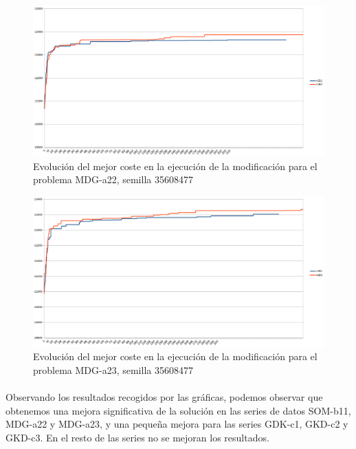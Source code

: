 	\begin{figure}[H]
		\centering
		\includegraphics[scale=0.3]{img/convergenciaMDG2mejora.png}
		\caption{Evolución del mejor coste en la ejecución de la modificación para el problema MDG-a22, semilla 35608477}
		\label{MDG-a_22_convergencia_mejora}
	\end{figure}

	\begin{figure}[H]
		\centering
		\includegraphics[scale=0.3]{img/convergenciaMDG3mejora.png}
		\caption{Evolución del mejor coste en la ejecución de la modificación para el problema MDG-a23, semilla 35608477}
		\label{MDG-a_23_convergencia_mejora}
	\end{figure}

	\paragraph{}Observando los resultados recogidos por las gráficas, podemos observar que obtenemos una mejora significativa de la solución en las series de datos SOM-b11, MDG-a22 y MDG-a23, y una pequeña mejora para las series GDK-c1, GKD-c2 y GKD-c3. En el resto de las series no se mejoran los resultados.
	
